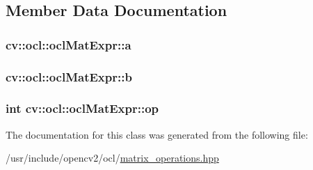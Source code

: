 \subsection{Member Data Documentation}
\hypertarget{classcv_1_1ocl_1_1oclMatExpr_a715f432db9c1d67ac4941991c3c9c731}{
\subsubsection[{a}]{ cv\-::ocl\-::ocl\-Mat\-Expr\-::a\hspace{0.3cm}{\ttfamily [protected]}}}\label{classcv_1_1ocl_1_1oclMatExpr_a715f432db9c1d67ac4941991c3c9c731}
\hypertarget{classcv_1_1ocl_1_1oclMatExpr_a31e6479fde11df85e73ca9217aad4ebe}{
\subsubsection[{b}]{ cv\-::ocl\-::ocl\-Mat\-Expr\-::b\hspace{0.3cm}{\ttfamily [protected]}}}\label{classcv_1_1ocl_1_1oclMatExpr_a31e6479fde11df85e73ca9217aad4ebe}
\hypertarget{classcv_1_1ocl_1_1oclMatExpr_a127d22bd0304c609f4deaf3d0650f77b}{
\subsubsection[{op}]{\setlength{\rightskip}{0pt plus 5cm}int cv\-::ocl\-::ocl\-Mat\-Expr\-::op\hspace{0.3cm}{\ttfamily [protected]}}}\label{classcv_1_1ocl_1_1oclMatExpr_a127d22bd0304c609f4deaf3d0650f77b}


The documentation for this class was generated from the following file\-:\begin{DoxyCompactItemize}
\item 
/usr/include/opencv2/ocl/\hyperlink{matrix__operations_8hpp}{matrix\-\_\-operations.\-hpp}\end{DoxyCompactItemize}

